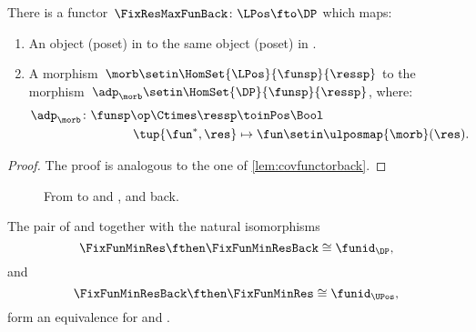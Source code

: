 \begin{lemma}
    \label{lem:cofunctorback}
    There is a functor~$\FixResMaxFunBack\colon \LPos \fto \DP$ which maps:
    \begin{enumerate}
        \item An object (poset) in \UPos to the same object (poset) in \DP.
        \item A morphism~$\morb\setin \HomSet{\LPos}{\funsp}{\ressp}$ to the morphism~$\adp_\morb \setin \HomSet{\DP}{\funsp}{\ressp}$, where:
              \begin{equation}
                  \begin{aligned}
                      \adp_\morb\colon \funsp\op \Ctimes \ressp & \toinPos \Bool \\
                      \tup{\fun^*,\res}                         & \mapsto \fun \setin \ulposmap{\morb}(\res).
                  \end{aligned}
              \end{equation}
    \end{enumerate}
\end{lemma}

\begin{proof}
    The proof is analogous to the one of \cref{lem:covfunctorback}.
\end{proof}

\begin{figure}[tbh]
    \centering
    \caption{From \DP to \UPos and \LPos, and back.}
\end{figure}


\begin{lemma}
    The pair of \FixFunMinRes and \FixFunMinResBack together with the natural isomorphisms
    \begin{equation}
        \FixFunMinRes \fthen \FixFunMinResBack \cong \funid_\DP,
    \end{equation}
    and
    \begin{equation}
        \FixFunMinResBack \fthen \FixFunMinRes \cong \funid_\UPos,
    \end{equation}
    form an equivalence for \DP and \UPos.
\end{lemma}

